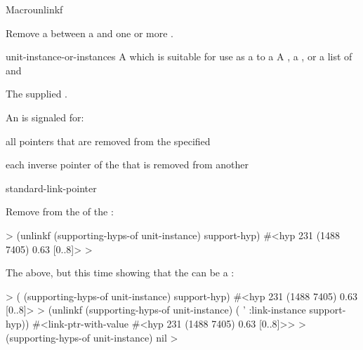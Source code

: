 \documentclass[10pt,twoside,english,pdftex]{article}
\begin{document}
\begin{functiondoc}{Macro}{unlinkf}%
  {
    }
%
%

\fnsyntax

\fnpurpose Remove a  between a  and one
or more .

\fnpackage {}

\fnmodule {}

\fnargs
\begin{args}{unit-instance-or-instances}
 A  which is suitable for use as a
 to a 
 A , a 
, or a list of  and 
\end{args}

\fnreturns The supplied .

\fnevents
{}%
%
%
%
%
%
An  is signaled for:
\begin{tightitemize}
\item all pointers that are removed from the specified
\item each inverse pointer of the  that is removed from
  another 
\end{tightitemize}

\begin{alsos}{standard-link-pointer}
\also[linkf]
\end{alsos}

\fnexamples
%
Remove  from the 
 of the  
:
%
\W\supp
\begin{example}
  > (unlinkf (supporting-hyps-of unit-instance) support-hyp)
  #<hyp 231 (1488 7405) 0.63 [0..8]>
  >
\end{example}
%
The above, but this time showing that the  can be a :
%
\W\supp\notpretop
\begin{example}
  > ( (supporting-hyps-of unit-instance) support-hyp)
  #<hyp 231 (1488 7405) 0.63 [0..8]>
  > (unlinkf (supporting-hyps-of unit-instance) 
             ( '
                 :link-instance support-hyp))
  #<link-ptr-with-value #<hyp 231 (1488 7405) 0.63 [0..8]>>
  > (supporting-hyps-of unit-instance)
  nil
  >
\end{example}

\end{functiondoc}
\end{document}
